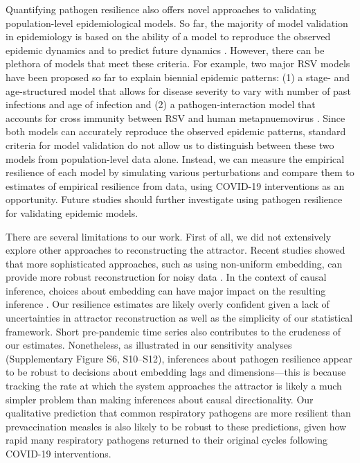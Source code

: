 \documentclass[12pt]{article}
\begin{document}
Quantifying pathogen resilience also offers novel approaches to validating population-level epidemiological models.
So far, the majority of model validation in epidemiology is based on the ability of a model to reproduce the observed epidemic dynamics and to predict future dynamics \citep{grenfell2002dynamics,bhattacharyya2015cross,pitzer2015environmental,dean2018human,pons2018serotype}.
However, there can be plethora of models that meet these criteria.
For example, two major RSV models have been proposed so far to explain biennial epidemic patterns: (1) a stage- and age-structured model that allows for disease severity to vary with number of past infections and age of infection \citep{pitzer2015environmental} and (2) a pathogen-interaction model that accounts for cross immunity between RSV and human metapnuemovirus \citep{bhattacharyya2015cross}.
Since both models can accurately reproduce the observed epidemic patterns, standard criteria for model validation do not allow us to distinguish between these two models from population-level data alone.
Instead, we can measure the empirical resilience of each model by simulating various perturbations and compare them to estimates of empirical resilience from data, using COVID-19 interventions as an opportunity.
Future studies should further investigate using pathogen resilience for validating epidemic models.

There are several limitations to our work.
First of all, we did not extensively explore other approaches to reconstructing the attractor.
Recent studies showed that more sophisticated approaches, such as using non-uniform embedding, can provide more robust reconstruction for noisy data \citep{tan2023selecting}.
In the context of causal inference, choices about embedding can have major impact on the resulting inference \citep{cobey2016limits}.
Our resilience estimates are likely overly confident given a lack of uncertainties in attractor reconstruction as well as the simplicity of our statistical framework.
Short pre-pandemic time series also contributes to the crudeness of our estimates.
Nonetheless, as illustrated in our sensitivity analyses (Supplementary Figure S6, S10--S12), inferences about pathogen resilience appear to be robust to decisions about embedding lags and dimensions---this is because tracking the rate at which the system approaches the attractor is likely a much simpler problem than making inferences about causal directionality.
Our qualitative prediction that common respiratory pathogens are more resilient than prevaccination measles is also likely to be robust to these predictions, given how rapid many respiratory pathogens returned to their original cycles following COVID-19 interventions.
\end{document}
